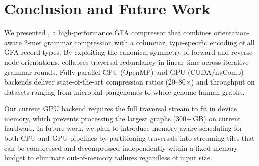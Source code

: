 \section{Conclusion and Future Work}\label{sec:conclusion}

We presented \gfaz, a high-performance GFA compressor that combines orientation-aware 2-mer grammar compression with a columnar, type-specific encoding of all GFA record types. By exploiting the canonical symmetry of forward and reverse node orientations, \gfaz collapses traversal redundancy in linear time across iterative grammar rounds. Fully parallel CPU (OpenMP) and GPU (CUDA/nvComp) backends deliver state-of-the-art compression ratios (20--80$\times$) and throughput on datasets ranging from microbial pangenomes to whole-genome human graphs.

Our current GPU backend requires the full traversal stream to fit in device memory, which prevents processing the largest graphs (300+\,GB) on current hardware. In future work, we plan to introduce memory-aware scheduling for both CPU and GPU pipelines by partitioning traversals into streaming tiles that can be compressed and decompressed independently within a fixed memory budget to eliminate out-of-memory failures regardless of input size.
